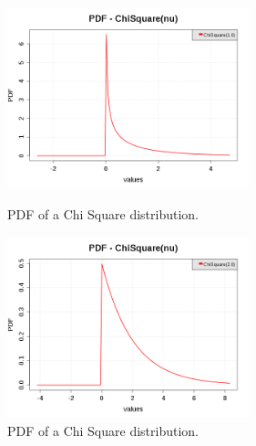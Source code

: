 \begin{figure}[H]
  \begin{minipage}{10cm}
    \begin{center}
      \includegraphics[width=7cm]{pdf_ChiSquare_1}
      \caption{PDF of a Chi Square distribution.}
      \label{PDFChiSquare1}
    \end{center}
  \end{minipage}
  \hfill
  \begin{minipage}{10cm}
    \begin{center}
      \includegraphics[width=7cm]{pdf_ChiSquare_2.png}
      \caption{PDF of a Chi Square distribution.}
      \label{PDFChiSquare2}
    \end{center}
  \end{minipage}
\end{figure}


